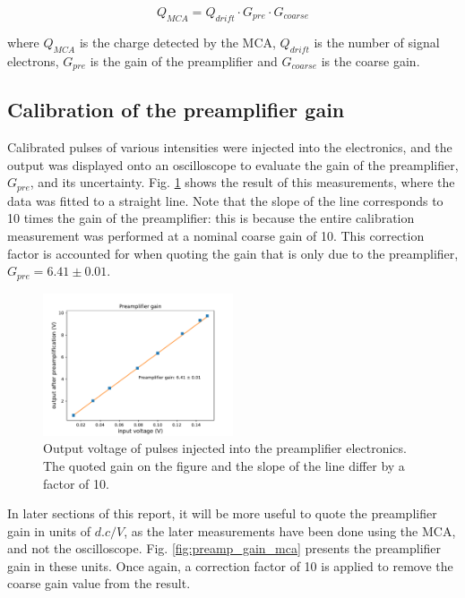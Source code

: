 \begin{equation}
  \label{eq:gain_system}
  Q_{MCA} = Q_{drift}\cdot G_{pre}\cdot G_{coarse}
\end{equation}

where $Q_{MCA}$ is the charge detected by the MCA, $Q_{drift}$ is the number of signal electrons, $G_{pre}$ is the gain of the preamplifier and $G_{coarse}$ is the coarse gain.

\subsection{Calibration of the preamp\-li\-fi\-er gain}
 Calibrated pulses of various intensities were injected into the electronics, and the output was displayed onto an oscilloscope to evaluate the gain of the preamplifier, $G_{pre}$, and its uncertainty. Fig. \ref{fig:preamp_gain} shows the result of this measurements, where the data was fitted to a straight line. Note that the slope of the line corresponds to 10 times the gain of the preamplifier: this is because the entire calibration measurement was performed at a nominal coarse gain of 10. This correction factor is accounted for when quoting the gain that is only due to the preamplifier, $G_{pre} = 6.41 \pm 0.01$.

\begin{figure}[htb]
  \includegraphics[scale=0.5,width=0.5\textwidth]{graphics/preamp_gain_calibration.pdf}
  \caption{Output voltage of pulses injected into the preamplifier electronics. The quoted gain on the figure and the slope of the line differ by a factor of 10.}
  \label{fig:preamp_gain}
\end{figure}

In later sections of this report, it will be more useful to quote the preamplifier gain in units of $d.c/V$, as the later measurements have been done using the MCA, and not the oscilloscope. Fig. \ref{fig:preamp_gain_mca} presents the preamplifier gain in these units. Once again, a correction factor of 10 is applied to remove the coarse gain value from the result.

